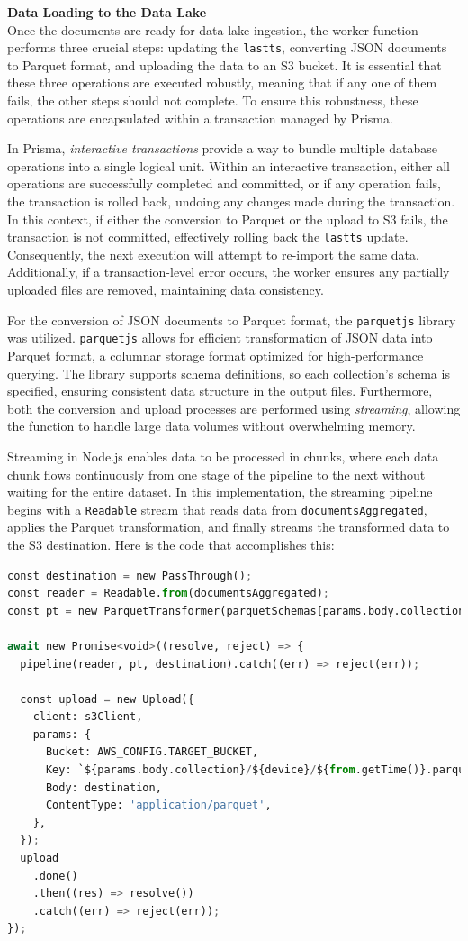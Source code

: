 \textbf{Data Loading to the Data Lake} \\
Once the documents are ready for data lake ingestion, the worker function performs three crucial steps: updating the \texttt{lastts}, converting JSON documents to Parquet format, and uploading the data to an S3 bucket. It is essential that these three operations are executed robustly, meaning that if any one of them fails, the other steps should not complete. To ensure this robustness, these operations are encapsulated within a transaction managed by Prisma.

In Prisma, \textit{interactive transactions} provide a way to bundle multiple database operations into a single logical unit. Within an interactive transaction, either all operations are successfully completed and committed, or if any operation fails, the transaction is rolled back, undoing any changes made during the transaction. In this context, if either the conversion to Parquet or the upload to S3 fails, the transaction is not committed, effectively rolling back the \texttt{lastts} update. Consequently, the next execution will attempt to re-import the same data. Additionally, if a transaction-level error occurs, the worker ensures any partially uploaded files are removed, maintaining data consistency.

For the conversion of JSON documents to Parquet format, the \texttt{parquetjs} library was utilized. \texttt{parquetjs} allows for efficient transformation of JSON data into Parquet format, a columnar storage format optimized for high-performance querying. The library supports schema definitions, so each collection's schema is specified, ensuring consistent data structure in the output files. Furthermore, both the conversion and upload processes are performed using \textit{streaming}, allowing the function to handle large data volumes without overwhelming memory.

Streaming in Node.js enables data to be processed in chunks, where each data chunk flows continuously from one stage of the pipeline to the next without waiting for the entire dataset. In this implementation, the streaming pipeline begins with a \texttt{Readable} stream that reads data from \texttt{documentsAggregated}, applies the Parquet transformation, and finally streams the transformed data to the S3 destination. Here is the code that accomplishes this:

\begin{lstlisting}[language=Python]
const destination = new PassThrough();
const reader = Readable.from(documentsAggregated);
const pt = new ParquetTransformer(parquetSchemas[params.body.collection]);

await new Promise<void>((resolve, reject) => {
  pipeline(reader, pt, destination).catch((err) => reject(err));

  const upload = new Upload({
    client: s3Client,
    params: {
      Bucket: AWS_CONFIG.TARGET_BUCKET,
      Key: `${params.body.collection}/${device}/${from.getTime()}.parquet`,
      Body: destination,
      ContentType: 'application/parquet',
    },
  });
  upload
    .done()
    .then((res) => resolve())
    .catch((err) => reject(err));
});
\end{lstlisting}


